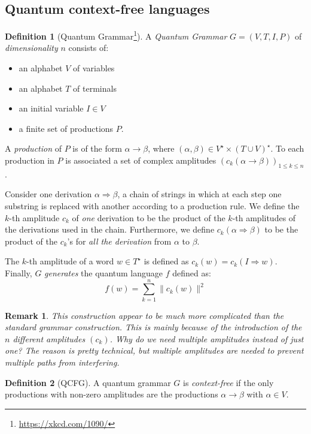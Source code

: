 \documentclass[12pt,a4paper]{article}
\theoremstyle{plain}
\newtheorem*{remark}{Remark}
\theoremstyle{definition}
\newtheorem*{definition}{Definition}
\begin{document}
\subsection{Quantum context-free languages}
\begin{definition}[Quantum Grammar\footnote{\url{https://xkcd.com/1090/}}]
    A \emph{Quantum Grammar} $G=(V, T, I, P)$ of \emph{dimensionality} $n$ consists of:
    \begin{itemize}[label=--, noitemsep]
        \item an alphabet $V$ of variables
        \item an alphabet $T$ of terminals
        \item an initial variable $I\in V$
        \item a finite set of productions $P$. 
    \end{itemize}
    A \emph{production} of $P$ is of the form $\alpha\to \beta$, where $(\alpha, \beta)\in V^\star\times (T\cup V)^\star$. To each production in $P$ is associated a set of complex amplitudes $\left(c_k(\alpha\to\beta)\right)_{1\leq k\leq n}$.

    Consider one derivation $\alpha\Rightarrow\beta$, a chain of strings in which at each step one substring is replaced with another according to a production rule. We define the $k$-th amplitude $c_k$ of \emph{one} derivation to be the product of the $k$-th amplitudes of the derivations used in the chain. Furthermore, we define $c_k(\alpha\Rightarrow\beta)$ to be the product of the $c_k$'s for \emph{all the derivation} from $\alpha$ to $\beta$.

    The $k$-th amplitude of a word $w\in T^\star$ is defined as $c_k(w) = c_k(I\Rightarrow w)$. Finally, $G$ \emph{generates} the quantum language $f$ defined as:
    \begin{equation*}
        f(w) = \sum_{k=1}^n \|c_k(w)\|^2
    \end{equation*}
\end{definition}

\begin{remark}
    This construction appear to be much more complicated than the standard grammar construction. This is mainly because of the introduction of the $n$ different amplitudes $(c_k)$. Why do we need multiple amplitudes instead of just one? The reason is pretty technical, but multiple amplitudes are needed to prevent multiple paths from interfering.
\end{remark}

\begin{definition}[QCFG]
    A quantum grammar $G$ is \emph{context-free} if the only productions with non-zero amplitudes are the productions $\alpha\to\beta$ with $\alpha\in V$.
\end{definition}
\end{document}
